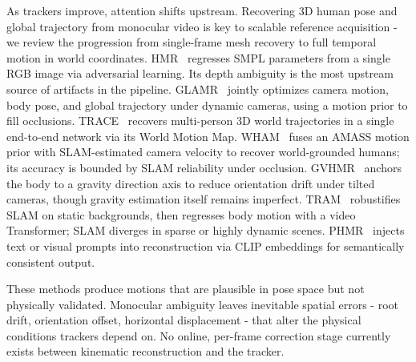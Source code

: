 \documentclass{article}
\begin{document}

	As trackers improve, attention shifts upstream. Recovering 3D human pose and global trajectory from monocular video is key to scalable reference acquisition - we review the progression from single-frame mesh recovery to full temporal motion in world coordinates. HMR~\cite{hmr2018} regresses SMPL parameters from a single RGB image via adversarial learning. Its depth ambiguity is the most upstream source of artifacts in the pipeline. GLAMR~\cite{yuan2022glamr} jointly optimizes camera motion, body pose, and global trajectory under dynamic cameras, using a motion prior to fill occlusions. TRACE~\cite{sun2023trace} recovers multi-person 3D world trajectories in a single end-to-end network via its World Motion Map. WHAM~\cite{whamshin2024} fuses an AMASS motion prior with SLAM-estimated camera velocity to recover world-grounded humans; its accuracy is bounded by SLAM reliability under occlusion. GVHMR~\cite{shen2024world} anchors the body to a gravity direction axis to reduce orientation drift under tilted cameras, though gravity estimation itself remains imperfect. TRAM~\cite{tramwang2024} robustifies SLAM on static backgrounds, then regresses body motion with a video Transformer; SLAM diverges in sparse or highly dynamic scenes. PHMR~\cite{wang2025prompthmr} injects text or visual prompts into reconstruction via CLIP embeddings for semantically consistent output.

	These methods produce motions that are plausible in pose space but not physically validated. Monocular ambiguity leaves inevitable spatial errors - root drift, orientation offset, horizontal displacement - that alter the physical conditions trackers depend on. No online, per-frame correction stage currently exists between kinematic reconstruction and the tracker.


\end{document}
